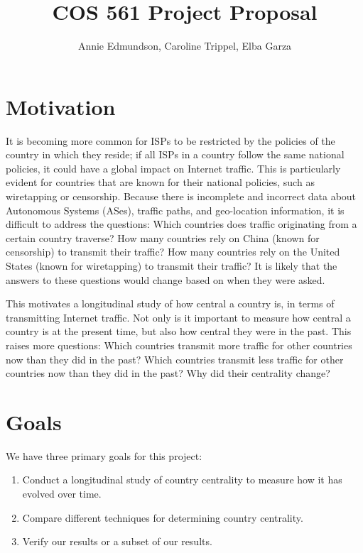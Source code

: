 \documentclass[12pt, letterpaper]{article}
\title{COS 561 Project Proposal}
\author{Annie Edmundson, Caroline Trippel, Elba Garza}
\begin{document}
\maketitle

\begin{spacing}{.95}

\section{Motivation}
It is becoming more common for ISPs to be restricted by the policies of the country in which they reside; if all ISPs in a country follow the same national policies, it could have a global impact on Internet traffic.  This is particularly evident for countries that are known for their national policies, such as wiretapping or censorship.  Because there is incomplete and incorrect data about Autonomous Systems (ASes), traffic paths, and geo-location information, it is difficult to address the questions: Which countries does traffic originating from a certain country traverse? How many countries rely on China (known for censorship) to transmit their traffic?  How many countries rely on the United States (known for wiretapping) to transmit their traffic?  It is likely that the answers to these questions would change based on when they were asked.

This motivates a longitudinal study of how central a country is, in terms of transmitting Internet traffic.  Not only is it important to measure how central a country is at the present time, but also how central they were in the past.  This raises more questions: Which countries transmit more traffic for other countries now than they did in the past?  Which countries transmit less traffic for other countries now than they did in the past?  Why did their centrality change?  

\section{Goals}
We have three primary goals for this project:
\begin{enumerate} [noitemsep]
\item Conduct a longitudinal study of country centrality to measure how it has evolved over time.
\item Compare different techniques for determining country centrality.
\item Verify our results or a subset of our results.
\end{enumerate}


\end{spacing}
\end{document}
